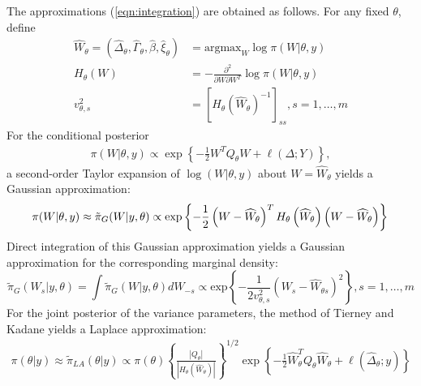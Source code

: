 \documentclass[AMA,STIX1COL,doublespace]{WileyNJD-v2}
\begin{document}
The approximations (\ref{eqn:integration}) are obtained as follows. For any fixed $\theta$, define
\begin{equation}\begin{aligned}\label{eqn:modeandhessian}
\widehat{W}_{\theta} = \left( \widehat{\Delta}_{\theta},\widehat{\Gamma}_{\theta},\widehat{\beta},\widehat{\xi}_{\theta}\right) &= \text{argmax}_{W}\log\pi(W|\theta,y) \\ 
H_{\theta}(W) &= -\frac{\partial^{2}}{\partial W \partial W^{T}}\log\pi(W|\theta,y) \\
v_{\theta,s}^{2} &= \left[H_\theta \left(\widehat{W}_{\theta}\right) ^ {-1} \right]_{ss}, s = 1,\ldots,m
\end{aligned}\end{equation}
For the conditional posterior
\begin{equation}\begin{aligned}\label{eqn:condpost}
\pi(W|\theta,y) \propto \exp\left\lbrace -\frac{1}{2}W^{T}Q_{\theta}W + \ell\left(\Delta;Y\right)\right\rbrace,
\end{aligned}\end{equation}
a second-order Taylor expansion of $\log(W|\theta,y)$ about $W = \widehat{W}_{\theta}$ yields a Gaussian approximation:
\begin{equation}\label{eqn:gaussianapprox}
\pi(W|\theta,y) \approx \tilde{\pi}_{G}(W|y,\theta) \propto \text{exp}\left\{-\frac{1}{2} \left(W-\widehat{W}_{\theta} \right)^T H_\theta\left(\widehat{W}_{\theta}\right) \left(W-\widehat{W}_{\theta} \right) \right\} \\
\end{equation}
Direct integration of this Gaussian approximation yields a Gaussian approximation for the corresponding marginal density:
\begin{equation}\label{eqb:marginalgaussianapprox}
\tilde{\pi}_{G}(W_{s}|y,\theta) = \int\tilde{\pi}_{G}(W|y,\theta)dW_{-s} \propto\text{exp}\left\{-\frac{1}{2v_{\theta,s}^{2}} \left(W_s-\widehat{W}_{\theta s} \right)^2 \right\}, s = 1,\ldots,m
\end{equation}
For the joint posterior of the variance parameters, the method of Tierney and Kadane \cite{tierney} yields a Laplace approximation:
\begin{equation}\begin{aligned}\label{eqn:laplace}
\pi(\theta|y) \approx \tilde{\pi}_{LA}(\theta|y) \propto \pi(\theta)\left\{\frac{\left|Q_{\theta}\right|}{\left|H_{\theta}\left(\widehat{W}_{\theta}\right)\right|}\right\}^{1/2}\exp\left\{ -\frac{1}{2}\widehat{W}_{\theta}^{T}Q_{\theta}\widehat{W}_{\theta} + \ell\left(\widehat{\Delta}_{\theta};y \right)\right\}
\end{aligned}\end{equation}
\end{document}
